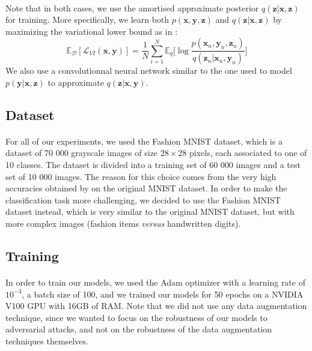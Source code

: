 \documentclass[11pt,twocolumn,letterpaper]{article}
\begin{document}
\paragraph{} Note that in both cases, we use the amortised approximate posterior $q(\bm{z}|\bm{x}, \bm{z})$ for training. More specifically, we learn both $p(\bm{x}, \bm{y}, \bm{z})$ and $q(\bm{z}|\bm{x}, \bm{z})$ by maximizing the variational lower bound as in \cite{auto_encoding_variational_bayes}:
\[ \mathbb{E}_{\mathcal{D}}[\mathcal{L}_{VI}(\bm{x}, \bm{y})] = \frac{1}{N} \sum \limits_{i=1}^N \mathbb{E}_q \Big[ \log{\frac{p(\bm{x}_n, \bm{y}_n, \bm{z}_n)}{q(\bm{z}_n|\bm{x}_n, \bm{y}_n)}} \Big] \]
We also use a convolutionnal neural network similar to the one used to model $p(\bm{y}|\bm{x}, \bm{z})$ to approximate $q(\bm{z}|\bm{x}, \bm{y})$.

\subsection{Dataset}

\paragraph{} For all of our experiments, we used the Fashion MNIST dataset, which is a dataset of 70 000 grayscale images of size $28 \times 28$ pixels, each associated to one of 10 classes. The dataset is divided into a training set of 60 000 images and a test set of 10 000 images. The reason for this choice comes from the very high accuracies obtained by \cite{main_paper} on the original MNIST dataset. In order to make the classification task more challenging, we decided to use the Fashion MNIST dataset instead, which is very similar to the original MNIST dataset, but with more complex images (fashion items \textit{versus} handwritten digits).

\subsection{Training} 

\paragraph{} In order to train our models, we used the Adam optimizer with a learning rate of $10^{-3}$, a batch size of 100, and we trained our models for 50 epochs on a NVIDIA V100 GPU with 16GB of RAM. Note that we did not use any data augmentation technique, since we wanted to focus on the robustness of our models to adversarial attacks, and not on the robustness of the data augmentation techniques themselves. 
\end{document}
